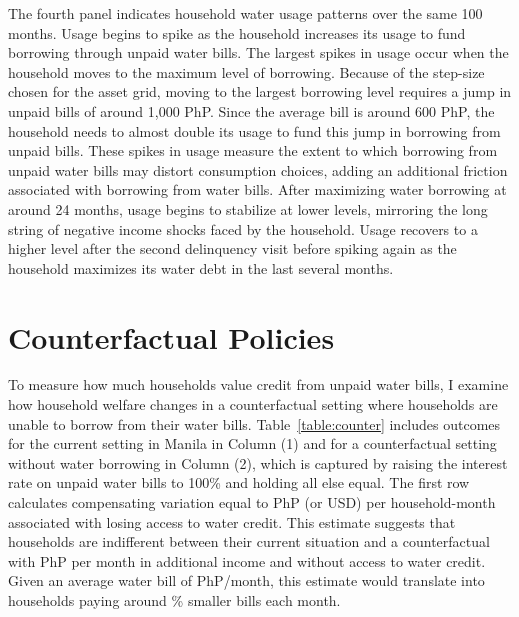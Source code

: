 \documentclass[12pt]{article}
\begin{document}
The fourth panel indicates household water usage patterns over the same 100 months.  Usage begins to spike as the household increases its usage to fund borrowing through unpaid water bills.  The largest spikes in usage occur when the household moves to the maximum level of borrowing.  Because of the step-size chosen for the asset grid, moving to the largest borrowing level requires a jump in unpaid bills of around 1,000 PhP.  Since the average bill is around 600 PhP, the household needs to almost double its usage to fund this jump in borrowing from unpaid bills.  These spikes in usage measure the extent to which borrowing from unpaid water bills may distort consumption choices, adding an additional friction associated with borrowing from water bills.  After maximizing water borrowing at around 24 months, usage begins to stabilize at lower levels, mirroring the long string of negative income shocks faced by the household.  Usage recovers to a higher level after the second delinquency visit before spiking again as the household maximizes its water debt in the last several months.

\section{Counterfactual Policies}\label{section:counterfactuals}
To measure how much households value credit from unpaid water bills, I examine how household welfare changes in a counterfactual setting where households are unable to borrow from their water bills.  Table~\ref{table:counter} includes outcomes for the current setting in Manila in Column (1) and for a counterfactual setting without water borrowing in Column (2), which is captured by raising the interest rate on unpaid water bills to 100\% and holding all else equal.  The first row calculates compensating variation equal to PhP (or USD) per household-month associated with losing access to water credit.  This estimate suggests that households are indifferent between their current situation and a counterfactual with PhP per month in additional income and without access to water credit.  Given an average water bill of PhP/month, this estimate would translate into households paying around \unskip\% smaller bills each month.  
\end{document}

